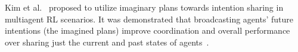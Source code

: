 \documentclass[letterpaper]{article} %
\begin{document}
Kim et al.~\citeyear{kim2020communication} proposed to utilize imaginary plans towards intention sharing in multiagent RL scenarios. It was demonstrated that broadcasting agents' future intentions (the imagined plans) improve coordination and overall performance over sharing just the current and past states of agents~\cite{foerster2016learning,sukhbaatar2016learning,jiang2018learning,das2019tarmac}.  





\end{document}
